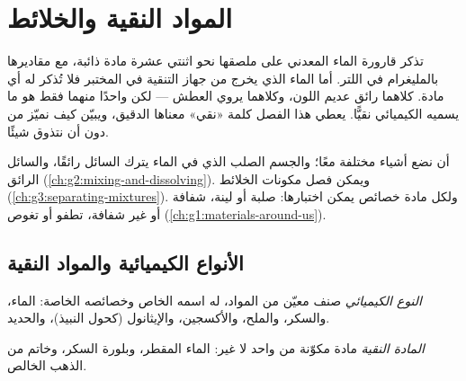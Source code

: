 \chapter{المواد النقية والخلائط}\label{ch:g6:pure-substances-and-mixtures}

تذكر قارورة الماء المعدني على ملصقها نحو اثنتي عشرة مادة ذائبة، مع
مقاديرها بالمليغرام في اللتر. أما الماء الذي يخرج من جهاز التنقية في
المختبر فلا تُذكر له أي مادة. كلاهما رائق عديم اللون، وكلاهما يروي
العطش --- لكن واحدًا منهما فقط هو ما يسميه الكيميائي نقيًّا. يعطي هذا الفصل
كلمة «نقي» معناها الدقيق، ويبيّن كيف نميّز  من 
دون أن نتذوق شيئًا.

\begin{recall}
 أن نضع أشياء مختلفة معًا؛ والجسم الصلب الذي  في الماء يترك
السائل رائقًا، والسائل الرائق 
(\cref{ch:g2:mixing-and-dissolving}). ويمكن فصل مكونات الخلائط
   
(\cref{ch:g3:separating-mixtures}). ولكل مادة خصائص يمكن اختبارها:
صلبة أو لينة، شفافة أو غير شفافة، تطفو أو تغوص
(\cref{ch:g1:materials-around-us}).
\end{recall}

\section{الأنواع الكيميائية والمواد النقية}

\begin{definition}\label{def:g6:pure-substances-and-mixtures:species}
\emph{النوع الكيميائي} صنف معيّن من المواد، له اسمه
الخاص وخصائصه الخاصة: الماء، والسكر، والملح، والأكسجين، والإيثانول
(كحول النبيذ)، والحديد.
\end{definition}

\begin{definition}\label{def:g6:pure-substances-and-mixtures:pure-substance}
\emph{المادة النقية} مادة مكوّنة من  واحد
لا غير: الماء المقطر، وبلورة السكر، وخاتم من الذهب الخالص.
\end{definition}

